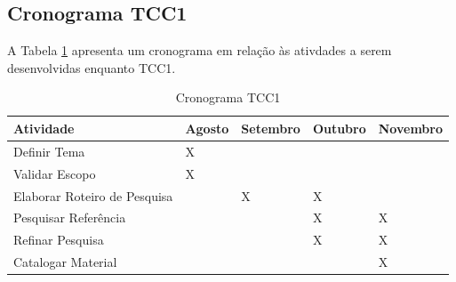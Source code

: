 \subsection{Cronograma TCC1}
A Tabela \ref{cronograma_tcc1} apresenta um cronograma em relação às ativdades a serem desenvolvidas enquanto TCC1.

\begin{table}[h!]
\centering
\caption{Cronograma TCC1}
\label{cronograma_tcc1}
\begin{tabular}{lllll}
\textbf{Atividade}           & \textbf{Agosto} & \textbf{Setembro} & \textbf{Outubro} & \textbf{Novembro} \\ \hline
Definir Tema                 & X               &                   &                  &                   \\ \hline
Validar Escopo               & X               &                   &                  &                   \\ \hline
Elaborar Roteiro de Pesquisa &                 & X                 & X                &                   \\ \hline
Pesquisar Referência         &                 &                   & X                & X                 \\ \hline
Refinar Pesquisa             &                 &                   & X                & X                 \\ \hline
Catalogar Material           &                 &                   &                  & X                 \\ \hline
\end{tabular}
\end{table}

